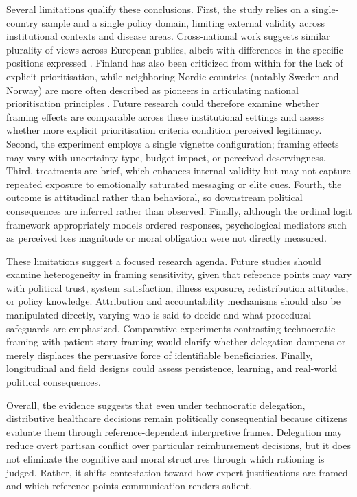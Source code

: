 \documentclass[11pt]{article}\usepackage[]{graphicx}\usepackage[]{xcolor}
\begin{document}
Several limitations qualify these conclusions. First, the study relies on a single-country sample and a single policy domain, limiting external validity across institutional contexts and disease areas. Cross-national work suggests similar plurality of views across European publics, albeit with differences in the specific positions expressed \parencite{vanExel2015QMethodology}. Finland has also been criticized from within for the lack of explicit prioritisation, while neighboring Nordic countries (notably Sweden and Norway) are more often described as pioneers in articulating national prioritisation principles \parencite{Cappelen2022ResponsibilityNorway, Torkki2022PrioritizationFinland}. Future research could therefore examine whether framing effects are comparable across these institutional settings and assess whether more explicit prioritisation criteria condition perceived legitimacy. Second, the experiment employs a single vignette configuration; framing effects may vary with uncertainty type, budget impact, or perceived deservingness. Third, treatments are brief, which enhances internal validity but may not capture repeated exposure to emotionally saturated messaging or elite cues. Fourth, the outcome is attitudinal rather than behavioral, so downstream political consequences are inferred rather than observed. Finally, although the ordinal logit framework appropriately models ordered responses, psychological mediators such as perceived loss magnitude or moral obligation were not directly measured.

These limitations suggest a focused research agenda. Future studies should examine heterogeneity in framing sensitivity, given that reference points may vary with political trust, system satisfaction, illness exposure, redistribution attitudes, or policy knowledge. Attribution and accountability mechanisms should also be manipulated directly, varying who is said to decide and what procedural safeguards are emphasized. Comparative experiments contrasting technocratic framing with patient-story framing would clarify whether delegation dampens or merely displaces the persuasive force of identifiable beneficiaries. Finally, longitudinal and field designs could assess persistence, learning, and real-world political consequences.

Overall, the evidence suggests that even under technocratic delegation, distributive healthcare decisions remain politically consequential because citizens evaluate them through reference-dependent interpretive frames. Delegation may reduce overt partisan conflict over particular reimbursement decisions, but it does not eliminate the cognitive and moral structures through which rationing is judged. Rather, it shifts contestation toward how expert justifications are framed and which reference points communication renders salient.
\end{document}
